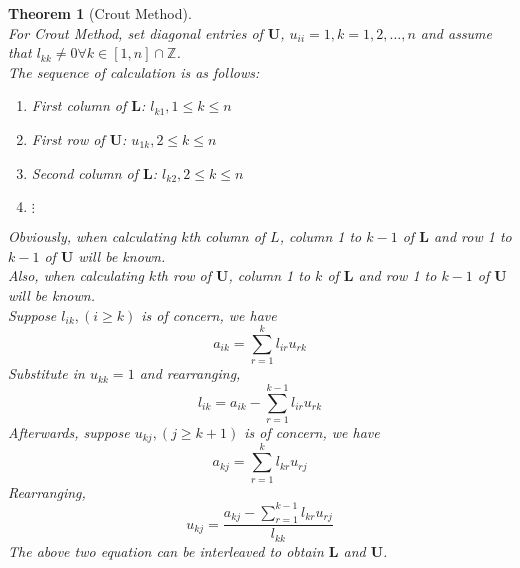 \documentclass[12pt]{article}
\newtheorem{theorem}{Theorem}[section]
\theoremstyle{definition}
\begin{document}
\begin{theorem}[Crout Method]
\hfill\\\normalfont For Crout Method, set diagonal entries of $\mathbf{U}$, $u_{ii}=1, k = 1,2,\ldots, n$ and assume that $l_{kk}\neq 0 \forall k\in[1,n]\cap\mathbb{Z}$.\\
The sequence of calculation is as follows:
\begin{enumerate}
  \item First column of $\mathbf{L}$: $l_{k1}, 1\leq k\leq n$
  \item First row of $\mathbf{U}$: $u_{1k}, 2\leq k\leq n$
  \item Second column of $\mathbf{L}$: $l_{k2}, 2\leq k\leq n$
  \item[] $\vdots$
\end{enumerate}
Obviously, when calculating $k$th column of $L$, column 1 to $k-1$ of $\mathbf{L}$ and row 1 to $k-1$ of $\mathbf{U}$ will be known.\\
Also, when calculating $k$th row of $\mathbf{U}$, column 1 to $k$ of $\mathbf{L}$ and row 1 to $k-1$ of $\mathbf{U}$ will be known.\\
Suppose $l_{ik}, (i\geq k)$ is of concern, we have
\[
a_{ik} = \sum_{r = 1}^k l_{ir}u_{rk}
\]
Substitute in $u_{kk}=1$ and rearranging,
\[
l_{ik} = a_{ik} - \sum_{r = 1}^{k-1}l_{ir}u_{rk}
\]
Afterwards, suppose $u_{kj}, (j\geq k+1)$ is of concern, we have
\[
a_{kj} = \sum_{r = 1}^k l_{kr}u_{rj}
\]
Rearranging, 
\[
u_{kj} = \frac{a_{kj}-\sum_{r=1}^{k-1}l_{kr}u_{rj}}{l_{kk}}
\]
The above two equation can be interleaved to obtain $\mathbf{L}$ and $\mathbf{U}$.
\end{theorem}
\end{document}
